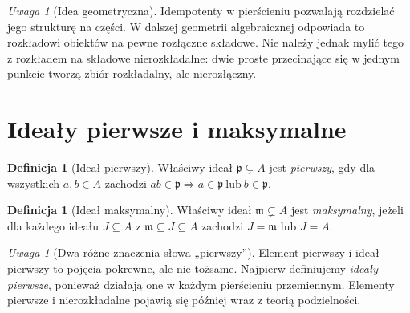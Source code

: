 \documentclass[11pt,a4paper,openany]{report}
\numberwithin{equation}{section}
\theoremstyle{plain}
\theoremstyle{definition}
\newtheorem{definicja}[twierdzenie]{Definicja}
\theoremstyle{remark}
\newtheorem{uwaga}[twierdzenie]{Uwaga}
\begin{document}
\begin{uwaga}[Idea geometryczna]
Idempotenty w pierścieniu pozwalają rozdzielać jego strukturę na
części. W dalszej geometrii algebraicznej odpowiada to rozkładowi
obiektów na pewne rozłączne składowe. Nie należy jednak mylić tego
z rozkładem na składowe nierozkładalne: dwie proste przecinające się
w jednym punkcie tworzą zbiór rozkładalny, ale nierozłączny.
\end{uwaga}

\section{Ideały pierwsze i maksymalne}

\begin{definicja}[Ideał pierwszy]
Właściwy ideał $\mathfrak p\subsetneq A$ jest \emph{pierwszy}, gdy
dla wszystkich $a,b\in A$ zachodzi
$ab\in\mathfrak p\Rightarrow a\in\mathfrak p\ \text{lub}\ b\in\mathfrak p$.
\end{definicja}

\begin{definicja}[Ideał maksymalny]
Właściwy ideał $\mathfrak m\subsetneq A$ jest \emph{maksymalny},
jeżeli dla każdego ideału $J\subseteq A$ z
$\mathfrak m\subseteq J\subseteq A$ zachodzi
$J=\mathfrak m$ lub $J=A$.
\end{definicja}

\begin{uwaga}[Dwa różne znaczenia słowa „pierwszy”]
Element pierwszy i ideał pierwszy to pojęcia pokrewne, ale nie tożsame.
Najpierw definiujemy \emph{ideały pierwsze}, ponieważ działają one
w każdym pierścieniu przemiennym. Elementy pierwsze i nierozkładalne
pojawią się później wraz z teorią podzielności.
\end{uwaga}
\end{document}
